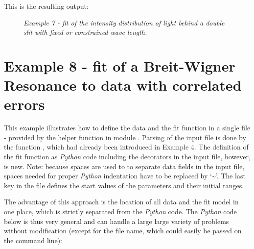 \documentclass[a4paper,10pt,english]{sphinxmanual}
\begin{document}
This is the resulting output:
\begin{figure}[htbp]
\centering
\capstart

\caption{\emph{Example 7 - fit of the intensity distribution of light behind a double slit with fixed or constrained wave length.}}\end{figure}


\section{Example 8 - fit of a Breit-Wigner Resonance to data with correlated errors}
\label{index:example-8-fit-of-a-breit-wigner-resonance-to-data-with-correlated-errors}
This example illustrates how to define the data and the fit function
in a single file - provided by the helper function {\hyperref[index:kafe.file_tools.buildFit_fromFile]{}}
in module {\hyperref[index:module-file_tools]{}}. Parsing of the input file is done by the
function {\hyperref[index:kafe.file_tools.parse_general_inputfile]{}}, which had already been introduced
in Example 4. The definition of the fit function as \emph{Python} code
including the  decorators in the input file, however, is new.
Note: because spaces are used to to separate data  fields in the
input file, spaces needed for proper \emph{Python} indentation have to be
replaced by `\textasciitilde{}'. The last key in the file defines the start values
of the parameters and their initial ranges.

The advantage of this approach is the location of all data
and the fit model in one place, which is strictly separated
from the \emph{Python} code. The \emph{Python} code below is thus very general
and can handle a large large variety of problems without
modification (except for the file name, which could easily be
passed on the command line):
\end{document}
